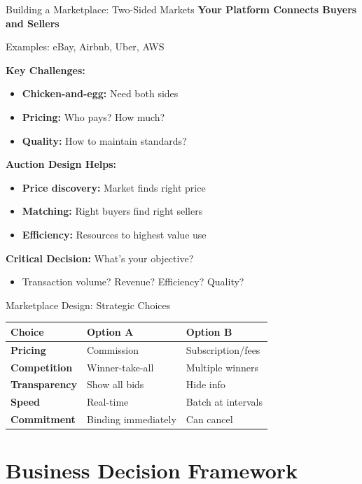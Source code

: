 \documentclass[xcolor={x11names}, aspectratio=169 ]{beamer}
\begin{document}
\begin{frame}{Building a Marketplace: Two-Sided Markets}
\textbf{Your Platform Connects Buyers and Sellers}

Examples: eBay, Airbnb, Uber, AWS

\textbf{Key Challenges:}
\begin{itemize}
  \item \textbf{Chicken-and-egg:} Need both sides
  \item \textbf{Pricing:} Who pays? How much?
  \item \textbf{Quality:} How to maintain standards?
\end{itemize}

\textbf{Auction Design Helps:}
\begin{itemize}
  \item \textbf{Price discovery:} Market finds right price
  \item \textbf{Matching:} Right buyers find right sellers
  \item \textbf{Efficiency:} Resources to highest value use
\end{itemize}

\textbf{Critical Decision:} What's your objective?
\begin{itemize}
  \item Transaction volume? Revenue? Efficiency? Quality?
\end{itemize}
\end{frame}

\begin{frame}{Marketplace Design: Strategic Choices}
\begin{tabular}{|p{2.8cm}|p{3.4cm}|p{2.8cm}|}
\hline
\textbf{Choice} & \textbf{Option A} & \textbf{Option B} \\
\hline
\textbf{Pricing} & 
Commission &
Subscription/fees \\
\hline
\textbf{Competition} & 
Winner-take-all &
Multiple winners \\
\hline
\textbf{Transparency} & 
Show all bids &
Hide info \\
\hline
\textbf{Speed} & 
Real-time &
Batch at intervals \\
\hline
\textbf{Commitment} & 
Binding immediately &
Can cancel \\
\hline
\end{tabular}
\end{frame}

\section{Business Decision Framework}
\end{document}
